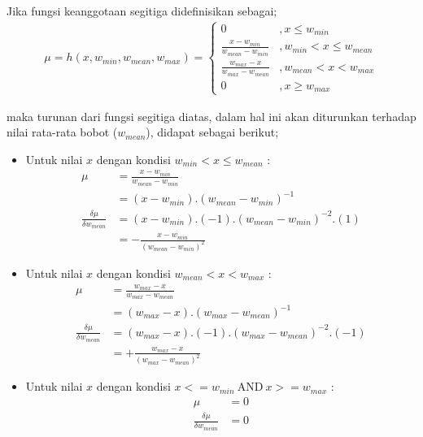 \noindent Jika fungsi keanggotaan segitiga didefinisikan sebagai;
\begin{align}
\label{eq:trim}
	\mu = h(x, w_{min}, w_{mean}, w_{max}) = \left\{ 
	\begin{array}{ll}
	0 & , x \leq w_{min}\\
	\frac{x - w_{min}}{w_{mean} - w_{min}} & , w_{min} < x \leq w_{mean} \\
	\frac{w_{max} - x}{w_{max} - w_{mean}} & , w_{mean} < x < w_{max} \\
	0 & , x \geq w_{max}
	\end{array}
\end{align}

\noindent maka turunan dari fungsi segitiga diatas, dalam hal ini akan
diturunkan terhadap nilai rata-rata bobot ($w_{mean}$), didapat sebagai berikut;
\begin{itemize}
  \item Untuk nilai $x$ dengan kondisi $w_{min} < x \leq w_{mean}$ :
  \begin{align}
	\label{eq:trim1}
		\mu &= \frac{x - w_{min}}{w_{mean} - w_{min}} \nonumber \\
			&= (x - w_{min}) . (w_{mean} - w_{min})^{-1} \nonumber \\
		\frac{\delta \mu}{\delta w_{mean}} &=
		(x - w_{min}).(-1).(w_{mean} - w_{min})^{-2}.(1) \nonumber \\
		 &=
		- \frac{x - w_{min}}{(w_{mean} - w_{min})^2}
	\end{align}

	\item Untuk nilai $x$ dengan kondisi  $w_{mean} < x < w_{max}$ :
	\begin{align}
	\label{eq:trim2}
		\mu &= \frac{w_{max} - x}{w_{max} - w_{mean}} \nonumber \\
			&= (w_{max} - x) . (w_{max} - w_{mean})^{-1} \nonumber \\
		\frac{\delta \mu}{\delta w_{mean}} &=
		(w_{max} - x).(-1).(w_{max} - w_{mean})^{-2}.(-1) \nonumber \\
		 &=
		+ \frac{w_{max} - x}{(w_{max} - w_{mean})^2}
	\end{align}
	
	\item Untuk nilai $x$ dengan kondisi $x <= w_{min}\ \text{AND}\ x >= w_{max}$ :
	\begin{align}
	\label{eq:trim3}
		\mu &= 0 \nonumber \\
		\frac{\delta \mu}{\delta w_{mean}} &= 0
	\end{align}
\end{itemize}

